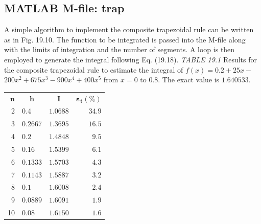 \documentclass[../main.tex]{subfiles}
\begin{document}
\subsection{MATLAB M-file: trap}

A simple algorithm to implement the composite trapezoidal rule can be written as in
Fig. 19.10. The function to be integrated is passed into the M-file along with the limits of
integration and the number of segments. A loop is then employed to generate the integral
following Eq. (19.18).
\textit{TABLE 19.1} Results for the composite trapezoidal rule to estimate the integral of $f(x)=0.2+25 x-$ $200 x^{2}+675 x^{3}-900 x^{4}+400 x^{5}$ from $x=0$ to $0.8$. The exact value is $1.640533$.
\begin{center}
\begin{tabular}{rlrr}
\hline $\boldsymbol{n}$ & \multicolumn{1}{c}{$\boldsymbol{h}$} & \multicolumn{1}{c}{$\boldsymbol{I}$} & $\boldsymbol{\varepsilon}_{\boldsymbol{t}}(\%)$ \\
2 & $0.4$ & $1.0688$ & $34.9$ \\
3 & $0.2667$ & $1.3695$ & $16.5$ \\
4 & $0.2$ & $1.4848$ & $9.5$ \\
5 & $0.16$ & $1.5399$ & $6.1$ \\
6 & $0.1333$ & $1.5703$ & $4.3$ \\
7 & $0.1143$ & $1.5887$ & $3.2$ \\
8 & $0.1$ & $1.6008$ & $2.4$ \\
9 & $0.0889$ & $1.6091$ & $1.9$ \\
10 & $0.08$ & $1.6150$ & $1.6$ \\
\hline
\end{tabular}
\end{center}
\end{document}
